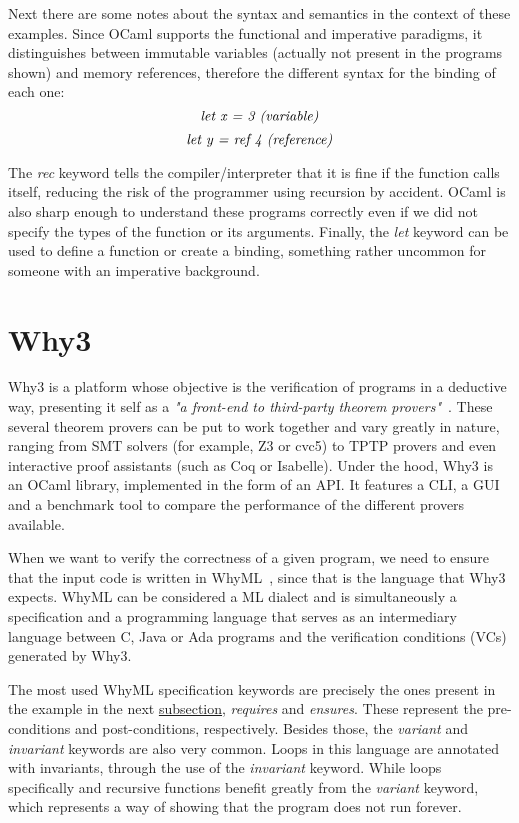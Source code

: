 Next there are some notes about the syntax and semantics in the context of these examples. 
Since OCaml supports the functional and imperative paradigms, it distinguishes between immutable variables (actually not present in the programs shown) and memory references, therefore the different syntax for the binding of each one: 
\[ \emph{let x = 3 (variable)} \]
\vspace{-25pt}
\[ \emph{let y = ref 4 (reference)} \]

The \emph{rec} keyword tells the compiler/interpreter that it is fine if the function calls itself, reducing the risk of the programmer using recursion by accident.
OCaml is also sharp enough to understand these programs correctly even if we did not specify the types of the function or its arguments.
Finally, the \emph{let} keyword can be used to define a function or create a binding, something rather uncommon for someone with an imperative background.


\section{Why3}
\label{sec:why3}

Why3 is a platform whose objective is the verification of programs in a deductive way, presenting it self as a \emph{"a front-end to third-party theorem provers"}~\cite{why3}.
These several theorem provers can be put to work together and vary greatly in nature, ranging from SMT solvers (for example, Z3 or cvc5) to TPTP provers and even interactive proof assistants (such as Coq or Isabelle).
Under the hood, Why3 is an OCaml library, implemented in the form of an API.
It features a CLI, a GUI and a benchmark tool to compare the performance of the different provers available.

When we want to verify the correctness of a given program, we need to ensure that the input code is written in WhyML~\cite{DBLP:conf/esop/FilliatreP13}, since that is the language that Why3 expects.
WhyML can be considered a ML dialect and is simultaneously a specification and a programming language that serves as an intermediary language between C, Java or Ada programs and the verification conditions (VCs) generated by Why3.

The most used WhyML specification keywords are precisely the ones present in the example in the next \hyperref[subsec:why3_example]{subsection}, \emph{requires} and \emph{ensures}.
These represent the pre-conditions and post-conditions, respectively.
Besides those, the \emph{variant} and \emph{invariant} keywords are also very common.
Loops in this language are annotated with invariants, through the use of the \emph{invariant} keyword.
While loops specifically and recursive functions benefit greatly from the \emph{variant} keyword, which represents a way of showing that the program does not run forever.

